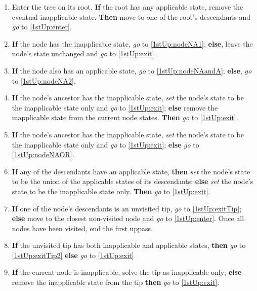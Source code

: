 \documentclass[a4paper,12pt]{article}
\begin{document}
\begin{enumerate}
    \item Enter the tree on its root. \textbf{If} the root has any applicable state, remove the eventual inapplicable state. \textbf{Then} move to one of the root's descendants and \textit{go} to \ref{1stUp:enter}.
    \item \label{1stUp:enter} \textbf{If} the node has the inapplicable state, \textit{go} to \ref{1stUp:nodeNA1}; \textbf{else}, leave the node's state unchanged and \textit{go} to \ref{1stUp:exit}.
    \item \label{1stUp:nodeNA1} \textbf{If} the node also has an applicable state, \textit{go} to \ref{1stUp:nodeNAandA}; \textbf{else}, \textit{go} to \ref{1stUp:nodeNA2}.
    \item \label{1stUp:nodeNAandA} \textbf{If} the node's ancestor has the inapplicable state, \textit{set} the node's state to be the inapplicable state only and \textit{go} to \ref{1stUp:exit}; \textbf{else} remove the inapplicable state from the current node states. \textbf{Then} \textit{go} to \ref{1stUp:exit}.
    \item \label{1stUp:nodeNA2} \textbf{If} the node's ancestor has the inapplicable state, \textit{set} the node's state to be the inapplicable state only and \textit{go} to \ref{1stUp:exit}; \textbf{else} \textit{go} to \ref{1stUp:nodeNAOR}.
    \item \label{1stUp:nodeNAOR} \textbf{If} any of the descendants have an applicable state, \textbf{then} \textit{set} the node's state to be the union of the applicable states of its descendants; \textbf{else} \textit{set} the node's state to be the inapplicable state only. \textbf{Then} \textit{go} to \ref{1stUp:exit}.
    \item \label{1stUp:exit} \textbf{If} one of the node's descendants is an unvisited tip, \textit{go} to \ref{1stUp:exitTip}; \textbf{else} move to the closest non-visited node and \textit{go} to \ref{1stUp:enter}. Once all nodes have been visited, end the first uppass.
    \item \label{1stUp:exitTip} \textbf{If} the unvisited tip has both inapplicable and applicable states, \textbf{then} \textit{go} to \ref{1stUp:exitTip2} \textbf{else} \textit{go} to \ref{1stUp:exit}
    \item \label{1stUp:exitTip2} \textbf{If} the current node is inapplicable, solve the tip as inapplicable only; \textbf{else} remove the inapplicable state from the tip \textbf{then} \textit{go} to \ref{1stUp:exit}.
\end{enumerate}
\end{document}

